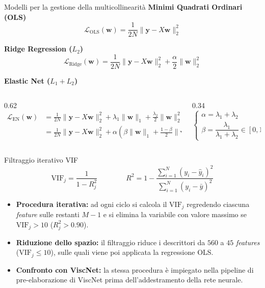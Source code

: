 \documentclass[10pt, aspectratio=169, table]{beamer}
\begin{document}
	\begin{frame}{Modelli per la gestione della multicollinearità}
		\small
		\textbf{Minimi Quadrati Ordinari (OLS)}
		$$\mathcal{L}_{\text{OLS}}(\mathbf{w}) = \frac{1}{2N}\|\mathbf{y} - X\mathbf{w}\|_2^2$$
		
		\vspace{0.25cm}
		\textbf{Ridge Regression ($L_2$)}
		$$\mathcal{L}_{\text{Ridge}}(\mathbf{w}) = \frac{1}{2N}\|\mathbf{y} - X\mathbf{w}\|_2^2 + \frac{\alpha}{2}\|\mathbf{w}\|_2^2$$
		
		\vspace{0.25cm}
		\textbf{Elastic Net ($L_1 + L_2$)}
		\vspace{-0.2cm}
		\begin{columns}[c]
			\begin{column}{0.62\textwidth}
				$$\begin{aligned}
					\mathcal{L}_{\text{EN}}(\mathbf{w}) &= \frac{1}{2N}\|\mathbf{y} - X\mathbf{w}\|_2^2 + \lambda_1 \|\mathbf{w}\|_1 + \frac{\lambda_2}{2} \|\mathbf{w}\|_2^2 \\[0.2cm]
					&= \frac{1}{2N}\|\mathbf{y} - X\mathbf{w}\|_2^2 + \alpha \left( \beta \|\mathbf{w}\|_1 + \frac{1-\beta}{2} \|\mathbf{w}\|_2^2 \right)
				\end{aligned}$$
			\end{column}
			\begin{column}{0.34\textwidth}
				$$\begin{cases}
					\alpha = \lambda_1 + \lambda_2 \\[0.2cm]
					\beta = \dfrac{\lambda_1}{\lambda_1 + \lambda_2} \in [0, 1]
				\end{cases}$$
			\end{column}
		\end{columns}
	\end{frame}
	
	\begin{frame}{Filtraggio iterativo VIF}
		\small
		$$\text{VIF}_j = \frac{1}{1 - R_j^2} \qquad \qquad R^2 = 1 - \frac{\sum_{i=1}^{N} (y_i - \hat{y}_i)^2}{\sum_{i=1}^{N} (y_i - \bar{y})^2}$$
		\vspace{0.3cm}
		\begin{itemize}
			\item \textbf{Procedura iterativa:} ad ogni ciclo si calcola il $\text{VIF}_j$ regredendo ciascuna \textit{feature} sulle restanti $M-1$ e si elimina la variabile con valore massimo se $\text{VIF}_j > 10$ ($R_j^2 > 0.90$).
			\vspace{0.25cm}
			\item \textbf{Riduzione dello spazio:} il filtraggio riduce i descrittori da $560$ a $45$ \textit{features} ($\text{VIF}_j \le 10$), sulle quali viene poi applicata la regressione OLS.
			\vspace{0.25cm}
			\item \textbf{Confronto con ViscNet:} la stessa procedura è impiegato nella pipeline di pre-elaborazione di ViscNet prima dell'addestramento della rete neurale.
		\end{itemize}
	\end{frame}
	
\end{document}
